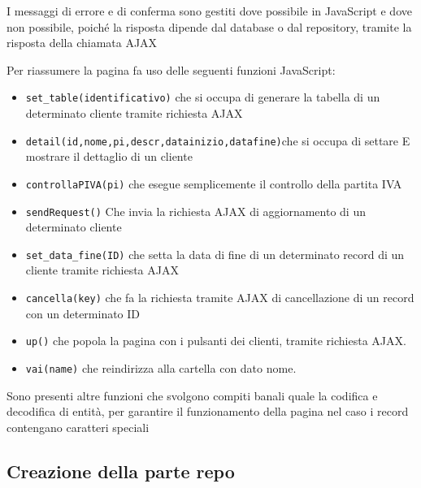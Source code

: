 I messaggi di errore e di conferma sono gestiti dove possibile in JavaScript e dove non possibile, poiché la risposta dipende dal database o dal repository, tramite la risposta della chiamata AJAX

Per riassumere la pagina fa uso delle seguenti funzioni JavaScript:
\begin{itemize}
\item \texttt{set\_table(identificativo)} che si occupa di generare la tabella di un determinato cliente tramite richiesta AJAX
\item \texttt{detail(id,nome,pi,descr,datainizio,datafine)}che si occupa di settare 
E mostrare il dettaglio di un cliente
\item \texttt{controllaPIVA(pi)} che esegue semplicemente  il controllo della partita IVA
\item \texttt{sendRequest()} Che invia la richiesta AJAX di aggiornamento di un determinato cliente
\item \texttt{set\_data\_fine(ID)} che setta la data di fine di un determinato record di un cliente tramite richiesta AJAX
\item \texttt{cancella(key)} che fa la richiesta tramite AJAX di cancellazione di un record con un determinato ID
\item \texttt{up()} che popola la pagina con i pulsanti dei clienti, tramite richiesta AJAX.
\item \texttt{vai(name)} che reindirizza alla cartella con dato nome.
\end{itemize}
Sono presenti altre funzioni che svolgono compiti banali quale la codifica e decodifica di entità, per garantire il funzionamento della pagina nel caso i record contengano caratteri speciali



\subsection{Creazione della parte repo}
